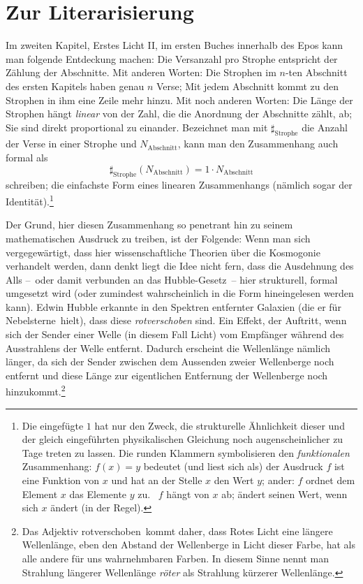 \newpage
\section{Zur Literarisierung}

Im zweiten Kapitel, Erstes Licht II, im ersten Buches innerhalb des Epos kann man
  folgende Entdeckung machen:
Die Versanzahl pro Strophe entspricht der Zählung der Abschnitte.
Mit anderen Worten: Die Strophen im $n$-ten Abschnitt des ersten 
  Kapitels haben genau $n$ Verse; Mit jedem Abschnitt kommt zu den Strophen in
  ihm eine Zeile mehr hinzu.
Mit noch anderen Worten: Die Länge der Strophen hängt \emph{linear} von der
  Zahl, die die Anordnung der Abschnitte zählt, ab; Sie sind direkt
  proportional zu einander. 
Bezeichnet man mit $\sharp_{\text{Strophe}}$ die Anzahl der Verse in einer Strophe und
  $N_{\text{Abschnitt}}$, kann man den Zusammenhang auch formal als
  \begin{equation}
    \sharp_{\text{Strophe}}(N_{\text{Abschnitt}}) = 1 \cdot N_{\text{Abschnitt}}
  \end{equation}
  schreiben; die einfachste Form eines linearen Zusammenhangs (nämlich sogar
  der Identität).\footnote{Die eingefügte $1$ hat nur den Zweck, die
  strukturelle Ähnlichkeit dieser und der gleich eingeführten physikalischen
  Gleichung noch augenscheinlicher zu Tage treten zu lassen.
Die runden Klammern symbolisieren den \emph{funktionalen} Zusammenhang: $f(x)
  = y$ bedeutet (und liest sich als) \glqq der Ausdruck $f$ ist eine Funktion
  von $x$ und hat an der Stelle $x$ den Wert $y$; ander: $f$ ordnet dem Element
  $x$ das Elemente $y$ zu. \Dhei\ $f$ hängt von $x$ ab; \glqq ändert seinen
Wert, wenn sich $x$ ändert (in der Regel).}

Der Grund, hier diesen Zusammenhang so penetrant hin zu seinem mathematischen
  Ausdruck zu treiben, ist der Folgende:
Wenn man sich vergegewärtigt, dass hier wissenschaftliche Theorien über die
  Kosmogonie verhandelt werden, dann denkt liegt die Idee nicht fern, dass
  die Ausdehnung des Alls --~oder damit verbunden an das Hubble-Gesetz~-- hier
  strukturell, formal umgesetzt wird (oder zumindest wahrscheinlich in die
  Form hineingelesen werden kann).
Edwin Hubble erkannte in den Spektren entfernter Galaxien (die er für
  \glqq Nebelsterne\grqq\ hielt), dass diese \emph{rotverschoben} sind.
Ein Effekt, der Auftritt, wenn sich der Sender einer Welle (in diesem Fall
  Licht) vom Empfänger während des Ausstrahlens der Welle entfernt.
Dadurch erscheint die Wellenlänge nämlich länger, da sich der Sender zwischen
  dem Aussenden zweier Wellenberge noch entfernt und diese Länge zur
  eigentlichen Entfernung der Wellenberge noch hinzukommt.\footnote{Das
    Adjektiv \glqq rotverschoben\grqq\ kommt daher, dass Rotes Licht eine
    längere Wellenlänge, eben den Abstand der Wellenberge in Licht dieser
    Farbe, hat als alle andere für uns wahrnehmbaren Farben.
  In diesem Sinne nennt man Strahlung längerer Wellenlänge \emph{röter} als
    Strahlung kürzerer Wellenlänge.}

